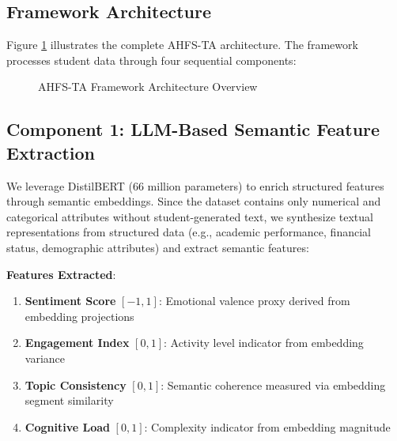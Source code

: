 \documentclass[journal]{IEEEtran}
\begin{document}
\subsection{Framework Architecture}

Figure \ref{fig:framework} illustrates the complete AHFS-TA architecture. The framework processes student data through four sequential components:

\begin{figure}[h]
\centering
{}
\caption{AHFS-TA Framework Architecture Overview}
\label{fig:framework}
\end{figure}

\subsection{Component 1: LLM-Based Semantic Feature Extraction}

We leverage DistilBERT (66 million parameters) to enrich structured features through semantic embeddings. Since the dataset contains only numerical and categorical attributes without student-generated text, we synthesize textual representations from structured data (e.g., academic performance, financial status, demographic attributes) and extract semantic features:

\textbf{Features Extracted}:
\begin{enumerate}
\item \textbf{Sentiment Score} $[-1, 1]$: Emotional valence proxy derived from embedding projections
\item \textbf{Engagement Index} $[0, 1]$: Activity level indicator from embedding variance
\item \textbf{Topic Consistency} $[0, 1]$: Semantic coherence measured via embedding segment similarity
\item \textbf{Cognitive Load} $[0, 1]$: Complexity indicator from embedding magnitude
\end{enumerate}
\end{document}

